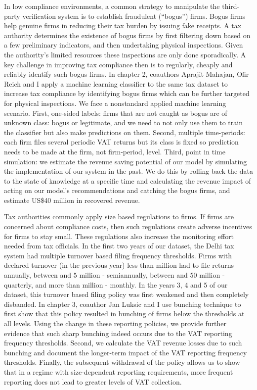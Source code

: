 {In low compliance environments, a common strategy to manipulate the third-party verification system is to establish fraudulent (``bogus'') firms. Bogus firms help genuine firms in reducing their tax burden by issuing fake receipts. A tax authority determines the existence of bogus firms by first filtering down based on a few preliminary indicators, and then undertaking  physical inspections. Given the authority’s limited resources these inspections are only done sporadically. A key challenge in improving tax compliance then is to regularly, cheaply and reliably identify such bogus firms. In chapter 2, coauthors Aprajit Mahajan, Ofir Reich and I apply a machine learning classifier to the same tax dataset to increase tax compliance by identifying bogus firms which can be further targeted for physical inspections. We face a nonstandard applied machine learning scenario. First, one-sided labels: firms that are not caught as bogus are of unknown class: bogus or legitimate, and we need to not only use them to train the classifier but also make predictions on them. Second, multiple time-periods: each firm files several periodic VAT returns but its class is fixed so prediction needs to be made at the firm, not firm-period, level. Third, point in time simulation: we estimate the revenue saving potential of our model by simulating the implementation of our system in the past. We do this by rolling back the data to the state of knowledge at a specific time and calculating the revenue impact of acting on our model’s recommendations and catching the bogus firms, and estimate US\$40 million in recovered revenue.

Tax authorities commonly apply size based regulations to firms. If firms are concerned about compliance costs, then such regulations create adverse incentives for firms to stay small. These regulations also increase the monitoring effort needed from tax officials. In the first two years of our dataset, the Delhi tax system had multiple turnover based filing frequency thresholds. Firms with declared turnover (in the previous year) less than  million had to file returns annually, between  and 5 million - semiannually, between  and 50 million - quarterly, and more than  million - monthly. In the years 3, 4 and 5 of our dataset, this turnover based filing policy was first weakened and then completely disbanded. In chapter 3, coauthor Jan Luksic and I use bunching technique to first show that this policy resulted in bunching of firms below the thresholds at all levels. Using the change in these reporting policies, we provide further evidence that such sharp bunching indeed occurs due to the VAT reporting frequency thresholds. Second, we calculate the VAT revenue losses due to such bunching and document the longer-term impact of the VAT reporting frequency thresholds. Finally, the subsequent withdrawal of the policy allows us to show that in a regime with size-dependent reporting requirements, more frequent reporting does not lead to greater levels of VAT collection.
}


